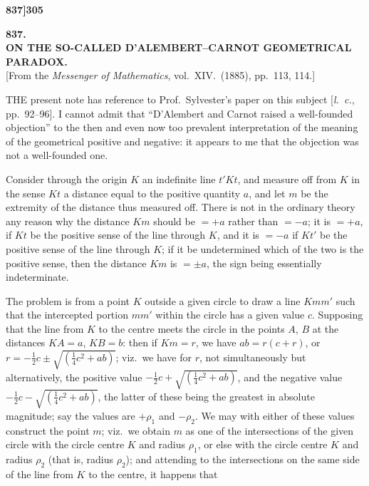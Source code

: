 \documentclass[11pt,a4paper]{book}
\begin{document}
\vspace{2em}


\newpage
\setcounter{page}{305}

\noindent\textbf{837]}\hfill\textbf{305}

\bigskip

\begin{center}
{\Large\textbf{837.}}\\[1em]
{\large\textbf{ON THE SO-CALLED D'ALEMBERT--CARNOT GEOMETRICAL PARADOX.}}\\[1em]
[From the \textit{Messenger of Mathematics}, vol.\ XIV.\ (1885), pp.\ 113, 114.]
\end{center}

\bigskip

\noindent THE present note has reference to Prof.\ Sylvester's paper on this subject [\textit{l.~c.}, pp.\ 92--96]. I cannot admit that ``D'Alembert and Carnot raised a well-founded objection'' to the then and even now too prevalent interpretation of the meaning of the geometrical positive and negative: it appears to me that the objection was not a well-founded one.

Consider through the origin $K$ an indefinite line $t'Kt$, and measure off from $K$ in the sense $Kt$ a distance equal to the positive quantity $a$, and let $m$ be the extremity of the distance thus measured off. There is not in the ordinary theory any reason why the distance $Km$ should be $= +a$ rather than $= -a$; it is $= +a$, if $Kt$ be the positive sense of the line through $K$, and it is $= -a$ if $Kt'$ be the positive sense of the line through $K$; if it be undetermined which of the two is the positive sense, then the distance $Km$ is $= \pm a$, the sign being essentially indeterminate.

The problem is from a point $K$ outside a given circle to draw a line $Kmm'$ such that the intercepted portion $mm'$ within the circle has a given value $c$. Supposing that the line from $K$ to the centre meets the circle in the points $A$, $B$ at the distances $KA = a$, $KB = b$: then if $Km = r$, we have $ab = r(c + r)$, or $r = -\tfrac{1}{2}c \pm \sqrt{(\tfrac{1}{4}c^2 + ab)}$; viz.\ we have for $r$, not simultaneously but alternatively, the positive value $-\tfrac{1}{2}c + \sqrt{(\tfrac{1}{4}c^2 + ab)}$, and the negative value $-\tfrac{1}{2}c - \sqrt{(\tfrac{1}{4}c^2 + ab)}$, the latter of these being the greatest in absolute magnitude; say the values are $+\rho_1$ and $-\rho_2$. We may with either of these values construct the point $m$; viz.\ we obtain $m$ as one of the intersections of the given circle with the circle centre $K$ and radius $\rho_1$, or else with the circle centre $K$ and radius $\rho_2$ (that is, radius $\rho_2$); and attending to the intersections on the same side of the line from $K$ to the centre, it happens that
\end{document}
